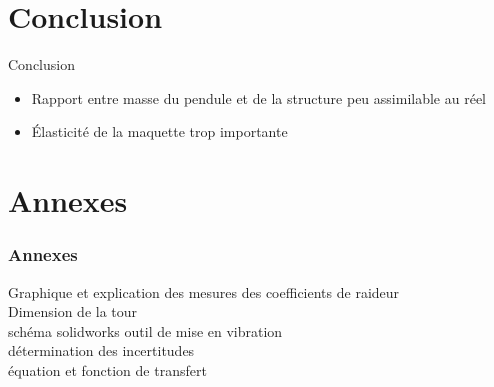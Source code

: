 \documentclass{beamer}
\begin{document}
	
	
	
	
\section{Conclusion}
\begin{frame}{Conclusion}
	\begin{itemize}
		\item Rapport entre masse du pendule et de la structure peu assimilable au réel
		\item Élasticité de la maquette trop importante
	\end{itemize}
\end{frame}	
	
	
\section{Annexes}
	
	\begin{frame}
		\frametitle{Annexes}
		Graphique et explication des mesures des coefficients de raideur\\
		Dimension de la tour\\
		schéma solidworks outil de mise en vibration \\
		détermination des incertitudes\\
		équation et fonction de transfert\\
		
	\end{frame}
\end{document}
